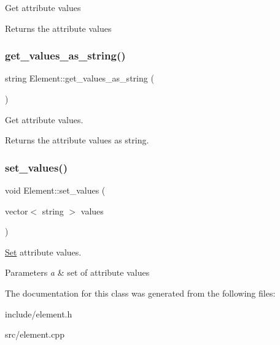 Get attribute values \begin{DoxyReturn}{Returns}
the attribute values 
\end{DoxyReturn}
\mbox{\label{classElement_a50b58de922a1cb1ee1dea8abf789bb64}} 
\subsubsection{\texorpdfstring{get\+\_\+values\+\_\+as\+\_\+string()}{get\_values\_as\_string()}}
{\footnotesize\ttfamily string Element\+::get\+\_\+values\+\_\+as\+\_\+string (\begin{DoxyParamCaption}{ }\end{DoxyParamCaption})}

Get attribute values. \begin{DoxyReturn}{Returns}
the attribute values as string. 
\end{DoxyReturn}
\mbox{\label{classElement_aa962031ba982f58e7bd5caceb5b8d058}} 
\subsubsection{\texorpdfstring{set\+\_\+values()}{set\_values()}}
{\footnotesize\ttfamily void Element\+::set\+\_\+values (\begin{DoxyParamCaption}\item[{vector$<$ string $>$}]{values }\end{DoxyParamCaption})}

\hyperlink{classSet}{Set} attribute values. 
\begin{DoxyParams}{Parameters}
{\em a} & set of attribute values \\
\hline
\end{DoxyParams}


The documentation for this class was generated from the following files\+:\begin{DoxyCompactItemize}
\item 
include/element.\+h\item 
src/element.\+cpp\end{DoxyCompactItemize}
